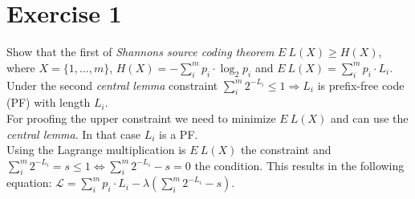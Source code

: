 \documentclass[a4paper,
  twoside, %
  headlines=2.1 %
  ]{scrartcl}
\author{\yourname}
\title{\lecture}
\subtitle{Exercise Sheet \sheetnum}
\begin{document}
\maketitle
\section*{Exercise 1}
Show that the first of \textit{Shannons source coding theorem} $E\ L(X) \geq H(X)$, where $X=\{1, ..., m\}$, $H(X)=-\sum_i^m p_i \cdot \log_2 p_i$ and $E\ L(X)=\sum_i^m p_i \cdot L_i$.\\

Under the second \textit{central lemma} constraint $\sum_i^m 2^{-L_i} \leq 1 \Rightarrow L_i$ is prefix-free code (PF) with length $L_i$.\\
For proofing the upper constraint we need to minimize $E\ L(X)$ and can use the \textit{central lemma}. In that case $L_i$ is a PF.\\


Using the Lagrange multiplication is $E\ L(X)$ the constraint and $\sum_i^m 2^{-L_i} = s \leq 1 \iff \sum_i^m 2^{-L_i} - s = 0$ the condition.  This results in the following equation: $\mathcal{L} = \sum_i^m p_i \cdot L_i - \lambda (\sum_i^m 2^{-L_i} - s)$.
\end{document}
